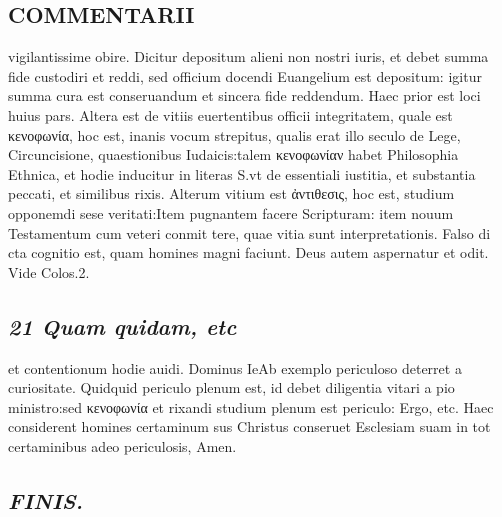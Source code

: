 \documentclass{article}
\begin{document}
\begin{pages}
\section*{COMMENTARII }
\marginpar{[ p.170 ]}\pstart vigilantissime obire. Dicitur depositum alieni non nostri iuris, et debet summa fide custodiri et reddi, sed officium docendi Euangelium est depositum: igitur summa cura est conseruandum et sincera fide reddendum. Haec prior est loci huius pars. Altera est de vitiis euertentibus officii integritatem, quale est κενοφωνία, hoc est, inanis vocum strepitus, qualis erat illo seculo de Lege, Circuncisione, quaestionibus Iudaicis:talem κενοφωνίαν habet Philosophia Ethnica, et hodie inducitur in literas S.vt de essentiali iustitia, et substantia peccati, et similibus rixis. Alterum vitium est ἀντιθεσις, hoc est, studium opponemdi sese veritati:Item pugnantem facere Scripturam: item nouum Testamentum cum veteri conmit tere, quae vitia sunt interpretationis. Falso di cta cognitio est, quam homines magni faciunt. Deus autem aspernatur et odit. Vide Colos.2.  \pend
{}
{}
\subsection*{\textit{21 Quam quidam, etc }}\pstart et contentionum hodie auidi. Dominus IeAb exemplo periculoso deterret a curiositate. Quidquid periculo plenum est, id debet diligentia vitari a pio ministro:sed κενοφωνία et rixandi studium plenum est periculo: Ergo, etc. Haec considerent homines certaminum sus Christus conseruet Esclesiam suam in tot certaminibus adeo periculosis, Amen.  \pend
{}
{}
\subsection*{\textit{FINIS. }}
\endnumbering
\end{pages}
\end{document}
